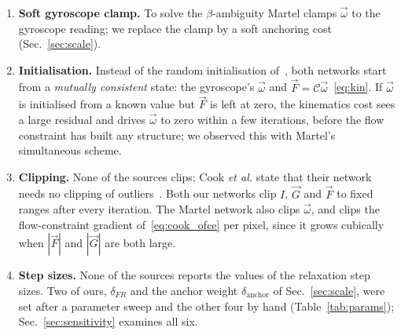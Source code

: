 \documentclass[journal]{IEEEtran}
\newcommand{\Imap}{I}
\newcommand{\Gmap}{\vec{G}}
\newcommand{\Fmap}{\vec{F}}
\newcommand{\Cmat}{\mathcal{C}}
\newcommand{\wvec}{\vec{\omega}}
\begin{document}
\begin{enumerate}

\item \textbf{Soft gyroscope clamp.} To solve the $\beta$-ambiguity Martel clamps $\wvec$ to the gyroscope reading; we replace the clamp by a soft anchoring cost (Sec.~\ref{sec:scale}).
  
\item \textbf{Initialisation.} Instead of the random initialisation of~\cite{cook2011,martel2015relational}, both networks start from a \emph{mutually consistent} state: the gyroscope's $\wvec$ and $\Fmap = \Cmat\wvec$~\eqref{eq:kin}. If $\wvec$ is initialised from a known value but $\Fmap$ is left at zero, the kinematics cost sees a large residual and drives $\wvec$ to zero within a few iterations, before the flow constraint has built any structure; we observed this with Martel's simultaneous scheme.
  
\item \textbf{Clipping.} None of the sources clips; Cook \emph{et al.} state that their network needs no clipping of outliers~\cite{cook2011}. Both our networks clip $\Imap$, $\Gmap$ and $\Fmap$ to fixed ranges after every iteration. The Martel network also clips $\wvec$, and clips the flow-constraint gradient of~\eqref{eq:cook_ofce} per pixel, since it grows cubically when $|\Fmap|$ and $|\Gmap|$ are both large.

\item \textbf{Step sizes.} None of the sources reports the values of the relaxation step sizes. Two of ours, $\delta_{F\!R}$ and the anchor weight $\delta_{\text{anchor}}$ of Sec.~\ref{sec:scale}, were set after a parameter sweep and the other four by hand (Table~\ref{tab:params}); Sec.~\ref{sec:sensitivity} examines all six.
\end{enumerate}
\end{document}
